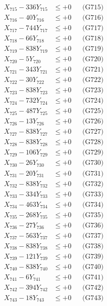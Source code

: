 \documentclass[a4paper,10pt]{article}
\begin{document}
{\begin{align}
X_{715} - 336Y_{715} &\leq +0 && \text{(G715)} \\
X_{716} - 40Y_{716} &\leq +0 && \text{(G716)} \\
X_{717} - 744Y_{717} &\leq +0 && \text{(G717)} \\
X_{718} - 66Y_{718} &\leq +0 && \text{(G718)} \\
X_{719} - 838Y_{719} &\leq +0 && \text{(G719)} \\
X_{720} - 5Y_{720} &\leq +0 && \text{(G720)} \\
\allowbreak
X_{721} - 343Y_{721} &\leq +0 && \text{(G721)} \\
X_{722} - 30Y_{722} &\leq +0 && \text{(G722)} \\
X_{723} - 838Y_{723} &\leq +0 && \text{(G723)} \\
X_{724} - 732Y_{724} &\leq +0 && \text{(G724)} \\
X_{725} - 487Y_{725} &\leq +0 && \text{(G725)} \\
X_{726} - 13Y_{726} &\leq +0 && \text{(G726)} \\
X_{727} - 838Y_{727} &\leq +0 && \text{(G727)} \\
X_{728} - 838Y_{728} &\leq +0 && \text{(G728)} \\
X_{729} - 106Y_{729} &\leq +0 && \text{(G729)} \\
X_{730} - 26Y_{730} &\leq +0 && \text{(G730)} \\
\allowbreak
X_{731} - 20Y_{731} &\leq +0 && \text{(G731)} \\
X_{732} - 838Y_{732} &\leq +0 && \text{(G732)} \\
X_{733} - 334Y_{733} &\leq +0 && \text{(G733)} \\
X_{734} - 463Y_{734} &\leq +0 && \text{(G734)} \\
X_{735} - 268Y_{735} &\leq +0 && \text{(G735)} \\
X_{736} - 27Y_{736} &\leq +0 && \text{(G736)} \\
X_{737} - 563Y_{737} &\leq +0 && \text{(G737)} \\
X_{738} - 838Y_{738} &\leq +0 && \text{(G738)} \\
X_{739} - 121Y_{739} &\leq +0 && \text{(G739)} \\
X_{740} - 838Y_{740} &\leq +0 && \text{(G740)} \\
\allowbreak
X_{741} - 6Y_{741} &\leq +0 && \text{(G741)} \\
X_{742} - 394Y_{742} &\leq +0 && \text{(G742)} \\
X_{743} - 18Y_{743} &\leq +0 && \text{(G743)} \\

\end{align}}
\end{document}
